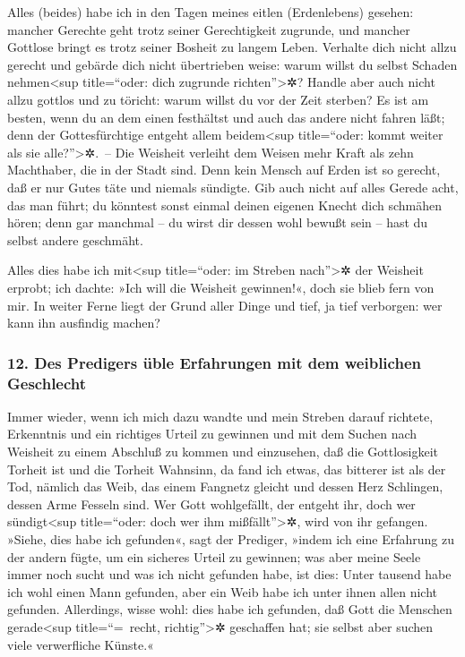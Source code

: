 Alles (beides) habe ich in den Tagen meines eitlen
(Erdenlebens) gesehen: mancher Gerechte geht trotz seiner Gerechtigkeit
zugrunde, und mancher Gottlose bringt es trotz seiner Bosheit zu langem
Leben. Verhalte dich nicht allzu gerecht und gebärde dich
nicht übertrieben weise: warum willst du selbst Schaden
nehmen\textless sup title=``oder: dich zugrunde richten''\textgreater✲?
Handle aber auch nicht allzu gottlos und zu töricht:
warum willst du vor der Zeit sterben? Es ist am besten,
wenn du an dem einen festhältst und auch das andere nicht fahren läßt;
denn der Gottesfürchtige entgeht allem beidem\textless sup title=``oder:
kommt weiter als sie alle?''\textgreater✲.~-- Die
Weisheit verleiht dem Weisen mehr Kraft als zehn Machthaber, die in der
Stadt sind. Denn kein Mensch auf Erden ist so gerecht,
daß er nur Gutes täte und niemals sündigte. Gib auch
nicht auf alles Gerede acht, das man führt; du könntest sonst einmal
deinen eigenen Knecht dich schmähen hören; denn gar
manchmal -- du wirst dir dessen wohl bewußt sein -- hast du selbst
andere geschmäht.

Alles dies habe ich mit\textless sup title=``oder: im
Streben nach''\textgreater✲ der Weisheit erprobt; ich dachte: »Ich will
die Weisheit gewinnen!«, doch sie blieb fern von mir. In
weiter Ferne liegt der Grund aller Dinge und tief, ja tief verborgen:
wer kann ihn ausfindig machen?

\hypertarget{des-predigers-uxfcble-erfahrungen-mit-dem-weiblichen-geschlecht}{%
\subsubsection{12. Des Predigers üble Erfahrungen mit dem weiblichen
Geschlecht}\label{des-predigers-uxfcble-erfahrungen-mit-dem-weiblichen-geschlecht}}

Immer wieder, wenn ich mich dazu wandte und mein Streben
darauf richtete, Erkenntnis und ein richtiges Urteil zu gewinnen und mit
dem Suchen nach Weisheit zu einem Abschluß zu kommen und einzusehen, daß
die Gottlosigkeit Torheit ist und die Torheit Wahnsinn,
da fand ich etwas, das bitterer ist als der Tod, nämlich
das Weib, das einem Fangnetz gleicht und dessen Herz Schlingen, dessen
Arme Fesseln sind. Wer Gott wohlgefällt, der entgeht ihr, doch wer
sündigt\textless sup title=``oder: doch wer ihm mißfällt''\textgreater✲,
wird von ihr gefangen. »Siehe, dies habe ich gefunden«,
sagt der Prediger, »indem ich eine Erfahrung zu der andern fügte, um ein
sicheres Urteil zu gewinnen; was aber meine Seele immer
noch sucht und was ich nicht gefunden habe, ist dies: Unter tausend habe
ich wohl einen Mann gefunden, aber ein Weib habe ich unter ihnen allen
nicht gefunden. Allerdings, wisse wohl: dies habe ich
gefunden, daß Gott die Menschen gerade\textless sup title=``=~recht,
richtig''\textgreater✲ geschaffen hat; sie selbst aber suchen viele
verwerfliche Künste.«

